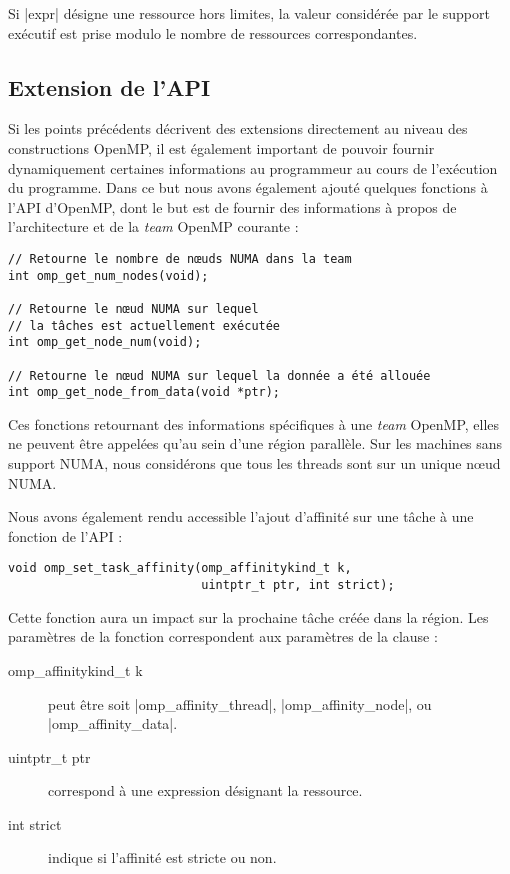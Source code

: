 Si |expr| désigne une ressource hors limites, la valeur considérée par le support exécutif est prise modulo le nombre de ressources correspondantes.

\subsection{Extension de l'API}

Si les points précédents décrivent des extensions directement au niveau des constructions OpenMP, il est également important de pouvoir fournir dynamiquement certaines informations au programmeur au cours de l'exécution du programme.
Dans ce but nous avons également ajouté quelques fonctions à l'API d'OpenMP, dont le but est de fournir des informations à propos de l'architecture et de la \emph{team} OpenMP courante :

\begin{lstlisting}
// Retourne le nombre de nœuds NUMA dans la team
int omp_get_num_nodes(void);

// Retourne le nœud NUMA sur lequel
// la tâches est actuellement exécutée
int omp_get_node_num(void);

// Retourne le nœud NUMA sur lequel la donnée a été allouée
int omp_get_node_from_data(void *ptr);
\end{lstlisting}

Ces fonctions retournant des informations spécifiques à une \emph{team} OpenMP, elles ne peuvent être appelées qu'au sein d'une région parallèle.
Sur les machines sans support NUMA, nous considérons que tous les threads sont sur un unique nœud NUMA.

Nous avons également rendu accessible l'ajout d'affinité sur une tâche à une fonction de l'API :
\begin{lstlisting}
void omp_set_task_affinity(omp_affinitykind_t k,
                           uintptr_t ptr, int strict);
\end{lstlisting}
Cette fonction aura un impact sur la prochaine tâche créée dans la région.
Les paramètres de la fonction correspondent aux paramètres de la clause :

\begin{description}
  \item [omp\_affinitykind\_t k] peut être soit |omp_affinity_thread|, |omp_affinity_node|, ou |omp_affinity_data|.
  \item [uintptr\_t ptr] correspond à une expression désignant la ressource.
  \item [int strict] indique si l'affinité est stricte ou non.
\end{description}


